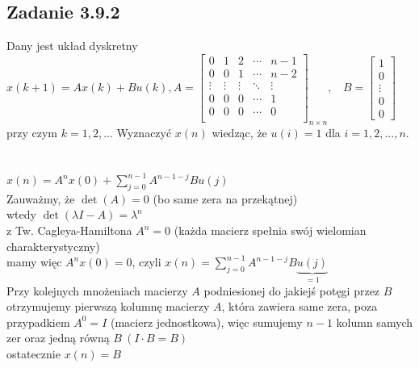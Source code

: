 \subsection*{Zadanie 3.9.2} {\color{darkgray}
	Dany jest układ dyskretny\\
	$x(k+1)=Ax(k)+Bu(k), A=\left[ \begin{array}{ccccc}   
		 0&1&2&\cdots&n-1 \\
		 0&0&1&\cdots&n-2  \\
		 \vdots&\vdots&\vdots&\ddots&\vdots  \\
		 0&0&0&\cdots&1  \\
		 0&0&0&\cdots&0  \\
	\end{array}\right]_{n \times n}, \ \ \ \ B=\left[\begin{array}{c}   
		1 \\ 0 \\ \vdots \\ 0 \\ 0
	\end{array}\right]$\\
	przy czym $k=1,2,...$ Wyznaczyć $x(n)$ wiedząc, że $u(i)=1$ dla $i=1,2,...,n$.\\
}\lineh
\\\\
$x(n)=A^nx(0)+\sum_{j=0}^{n-1}A^{n-1-j}Bu(j)$\\
Zauważmy, że $\det (A) = 0$ (bo same zera na przekątnej)\\
wtedy $\det(\lambda I-A)=\lambda^n$\\
z Tw. Cagleya-Hamiltona $A^n=0$ (każda macierz spełnia swój wielomian charakterystyczny)\\
mamy więc $A^nx(0)=0$, czyli $x(n)=\sum_{j=0}^{n-1}A^{n-1-j}B\underbrace{u(j)}_{=1}$\\
Przy kolejnych mnożeniach macierzy $A$ podniesionej do jakiejś potęgi przez $B$ otrzymujemy pierwszą kolumnę macierzy $A$, która zawiera same zera, poza przypadkiem $A^0=I$ (macierz jednostkowa), więc sumujemy $n-1$ kolumn samych zer oraz jedną równą $B \  (I\cdot B=B)$\\
ostatecznie $\boxed{x(n)=B}$

\pagebreak
